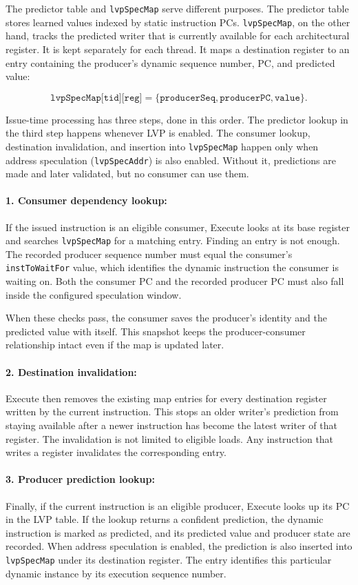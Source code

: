 The predictor table and \texttt{lvpSpecMap} serve different purposes.
The predictor table stores learned values indexed by static
instruction PCs. \texttt{lvpSpecMap}, on the other hand, tracks the
predicted writer that is currently available for each architectural
register. It is kept separately for each thread. It maps a destination
register to an entry containing the producer's dynamic
sequence number, PC, and predicted value:

\[
\texttt{lvpSpecMap[tid][reg]}
=
\{\texttt{producerSeq},\texttt{producerPC},\texttt{value}\}.
\]

Issue-time processing has three steps, done in this order. The
predictor lookup in the third step happens whenever LVP is enabled.
The consumer lookup, destination invalidation, and insertion into
\texttt{lvpSpecMap} happen only when address speculation
(\texttt{lvpSpecAddr}) is also enabled. Without it, predictions are
made and later validated, but no consumer can use them.

\paragraph{1. Consumer dependency lookup:}
If the issued instruction is an eligible consumer, Execute looks at
its base register and searches \texttt{lvpSpecMap} for a matching
entry. Finding an entry is not enough. The recorded producer sequence
number must equal the consumer's \texttt{instToWaitFor} value, which
identifies the dynamic instruction the consumer is waiting on. Both
the consumer PC and the recorded producer PC must also fall inside
the configured speculation window.

When these checks pass, the consumer saves the producer's identity
and the predicted value with itself. This snapshot keeps the
producer-consumer relationship intact even if the map is updated
later.

\paragraph{2. Destination invalidation:}
Execute then removes the existing map entries for every destination
register written by the current instruction. This stops an older writer's prediction from staying available after a newer instruction
has become the latest writer of that register. The invalidation is not
limited to eligible loads. Any instruction that writes a register
invalidates the corresponding entry.

\paragraph{3. Producer prediction lookup:}
Finally, if the current instruction is an eligible producer,
Execute looks up its PC in the LVP table. If the lookup returns a
confident prediction, the dynamic instruction is marked as predicted,
and its predicted value and producer state are recorded. When address
speculation is enabled, the prediction is also inserted into
\texttt{lvpSpecMap} under its destination register. The
entry identifies this particular dynamic instance by its execution
sequence number.

